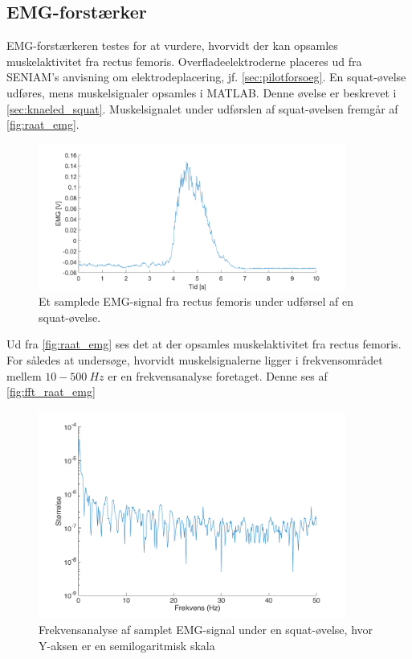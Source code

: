 \subsection{EMG-forstærker}

EMG-forstærkeren testes for at vurdere, hvorvidt der kan opsamles muskelaktivitet fra rectus femoris. Overfladeelektroderne placeres ud fra SENIAM's anvisning om elektrodeplacering, jf. \autoref{sec:pilotforsoeg}. En squat-øvelse udføres, mens muskelsignaler opsamles i MATLAB. Denne øvelse er beskrevet i \autoref{sec:knaeled_squat}. Muskelsignalet under udførslen af squat-øvelsen fremgår af \autoref{fig:raat_emg}. 

\begin{figure}[H]
\centering
\includegraphics[width=0.9\textwidth]{figures/raat_EMG_test}
\caption{Et samplede EMG-signal fra rectus femoris under udførsel af en squat-øvelse.}
\label{fig:raat_emg}
\end{figure}

\noindent
Ud fra \autoref{fig:raat_emg} ses det at der opsamles muskelaktivitet fra rectus femoris. For således at undersøge, hvorvidt muskelsignalerne ligger i frekvensområdet mellem $10-500~Hz$ er en frekvensanalyse foretaget. Denne ses af \autoref{fig:fft_raat_emg}

\begin{figure}[H]
\centering
\includegraphics[width=0.9\textwidth]{figures/fft_raat_EMG}
\caption{Frekvensanalyse af samplet EMG-signal under en squat-øvelse, hvor Y-aksen er en semilogaritmisk skala}
\label{fig:fft_raat_emg}
\end{figure}

